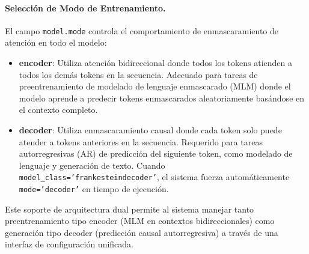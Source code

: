 \paragraph{Selección de Modo de Entrenamiento.}
El campo \texttt{model.mode} controla el comportamiento de enmascaramiento de atención en todo el modelo:
\begin{itemize}[leftmargin=*]
    \item \textbf{encoder}: Utiliza atención bidireccional donde todos los tokens atienden a todos los demás tokens en la secuencia. Adecuado para tareas de preentrenamiento de modelado de lenguaje enmascarado (MLM) donde el modelo aprende a predecir tokens enmascarados aleatoriamente basándose en el contexto completo.
    \item \textbf{decoder}: Utiliza enmascaramiento causal donde cada token solo puede atender a tokens anteriores en la secuencia. Requerido para tareas autorregresivas (AR) de predicción del siguiente token, como modelado de lenguaje y generación de texto. Cuando \texttt{model\_class='frankesteindecoder'}, el sistema fuerza automáticamente \texttt{mode='decoder'} en tiempo de ejecución.
\end{itemize}

Este soporte de arquitectura dual permite al sistema manejar tanto preentrenamiento tipo encoder (MLM en contextos bidireccionales) como generación tipo decoder (predicción causal autorregresiva) a través de una interfaz de configuración unificada.

